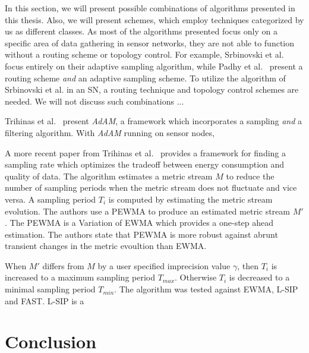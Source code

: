 In this section, we will present possible combinations of algorithms presented
in this thesis. Also, we will present schemes, which employ techniques
categorized by us as different classes. As most of the algorithms presented
focus only on a specific area of data gathering in sensor networks, they are
not able to function without a routing scheme or topology control. For example,
Srbinovski et al.~\cite{srbinovski2016energy} focus entirely on their adaptive
sampling algorithm, while Padhy et al.~\cite{padhy2006utility} present a
routing scheme \textit{and} an adaptive sampling scheme. To utilize the
algorithm of Srbinovski et al. in an \ac{SN}, a routing technique and topology
control schemes are needed. We will not discuss such combinations ...

Trihinas et al.~\cite{trihinas2015adam} present \textit{AdAM}, a framework
which incorporates a sampling \textit{and} a filtering algorithm. With
\textit{AdAM} running on sensor nodes, 


A more recent paper from Trihinas et al.~\cite{trihinas2015adam} provides a
framework for finding a sampling rate which optimizes the tradeoff between
energy consumption and quality of data. The algorithm estimates a metric stream
$ M $ to reduce the number of sampling periods when the metric stream does not
fluctuate and vice versa. A sampling period $ T_i $ is computed by estimating
the metric stream evolution. The authors use a \ac{PEWMA} to produce an
estimated metric stream $ M' $. The \ac{PEWMA} is a Variation of \ac{EWMA}
which provides a one-step ahead estimation. The authors state that \ac{PEWMA}
is more robust against abrunt transient changes in the metric evoultion than
\ac{EWMA}.

When $ M' $ differs from $ M $ by a user specified imprecision value $
\gamma $, then $ T_i $ is increased to a maximum sampling period $ T_{max}
$. Otherwise $ T_i $ is decreased to a minimal sampling period $ T_{min}
$. The algorithm was tested against \ac{EWMA}, L-SIP and FAST. L-SIP is a  



\section{Conclusion}

